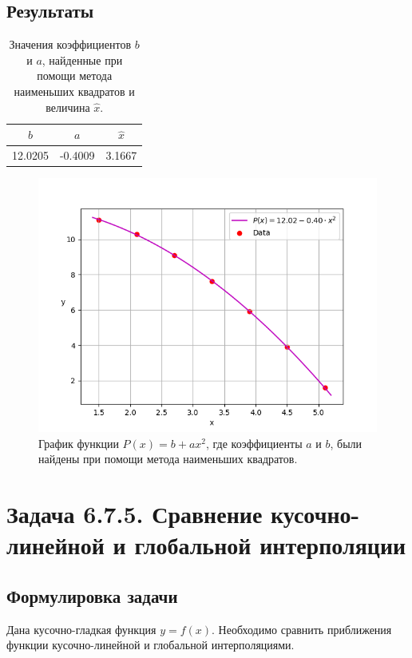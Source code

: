 \documentclass[12pt]{article}%
\begin{document}
\subsection{Результаты}
\begin{table}[!h]
\centering
\begin{tabular}{|c|c|c|}
     \hline
     $b$ & $a$ & $\hat{x}$ \\
     \hline
     12.0205 & -0.4009 & 3.1667 \\
     \hline
\end{tabular}
\caption{Значения коэффициентов $b$ и $a$, найденные при помощи метода наименьших квадратов и величина $\hat{x}.$ }
\end{table}

\newpage
\begin{figure}[h]
    \centering
    \includegraphics[width=\textwidth]{task2-polynomial.png}
    \caption{График функции $P(x) = b + ax^2$, где коэффициенты $a$ и $b$, были найдены при помощи метода наименьших квадратов.}
\end{figure}



\newpage
\section{Задача 6.7.5. Сравнение кусочно-линейной и глобальной интерполяции}
\subsection{Формулировка задачи}
Дана кусочно-гладкая функция $y=f(x)$. Необходимо сравнить приближения функции кусочно-линейной и глобальной интерполяциями.
\end{document}
